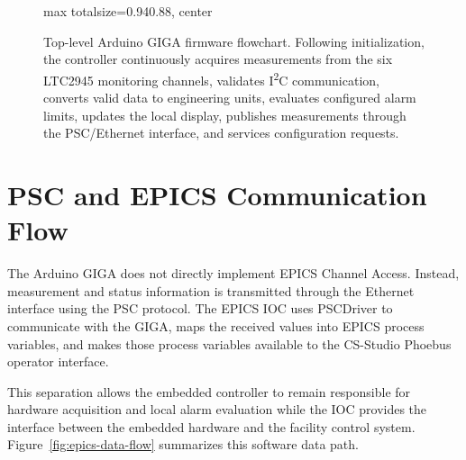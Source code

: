 \begin{figure}[H]
\begin{adjustbox}{
            max totalsize={0.94\textwidth}{0.88\textheight},
            center
        }

    \end{adjustbox}

    \caption{
        Top-level Arduino GIGA firmware flowchart. Following initialization,
        the controller continuously acquires measurements from the six LTC2945
        monitoring channels, validates I\textsuperscript{2}C communication,
        converts valid data to engineering units, evaluates configured alarm
        limits, updates the local display, publishes measurements through the
        PSC/Ethernet interface, and services configuration requests.
    }
    \label{fig:firmware-flowchart}

\end{figure}


\section{PSC and EPICS Communication Flow}
\label{sec:epics-software-flowchart}

The Arduino GIGA does not directly implement EPICS Channel Access. Instead,
measurement and status information is transmitted through the Ethernet
interface using the PSC protocol. The EPICS IOC uses PSCDriver to communicate
with the GIGA, maps the received values into EPICS process variables, and makes
those process variables available to the CS-Studio Phoebus operator interface.

This separation allows the embedded controller to remain responsible for
hardware acquisition and local alarm evaluation while the IOC provides the
interface between the embedded hardware and the facility control system.
Figure~\ref{fig:epics-data-flow} summarizes this software data path.

